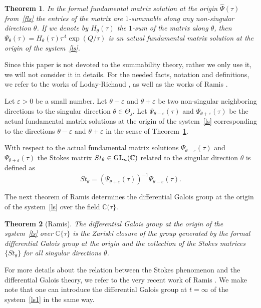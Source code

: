 \documentclass[10pt,a4paper]{amsart}
\numberwithin{equation}{section}
\newtheorem{Theorem}{Theorem}[section]
\begin{document}
 \begin{Theorem}\label{R}
 In the formal fundamental matrix solution at the origin $\hat{\Psi}(\tau)$ from~\eqref{fls} the entries of the
 matrix  are $1$-summable along any non-singular direction $\theta$. If we denote by $H_{\theta}(\tau)$
 the $1$-sum of the matrix  along $\theta$, then
 $\Psi_{\theta}(\tau)=H_{\theta}(\tau) \tau^{\Lambda} \exp(Q/\tau)$ is an actual fundamental matrix solution at the origin
 of the system~\eqref{ls}.
 \end{Theorem}
 Since this paper is not devoted to the summability theory, rather we only use it, we will not consider it in details.
 For the needed facts, notation and definitions, we refer to the works of Loday-Richaud \cite{LR}, as well as
 the works of Ramis \cite{R3, R2}.

 Let $\varepsilon > 0$ be a small number. Let $\theta-\varepsilon$ and $\theta+\varepsilon$ be two non-singular neighboring
 directions to the singular direction $\theta\in \Theta_j$. Let $\Psi_{\theta-\varepsilon}(\tau)$ and $\Psi_{\theta+\varepsilon}(\tau)$
 be the actual fundamental matrix solutions at the origin of the system~\eqref{ls} corresponding to
 the directions $\theta-\varepsilon$ and $\theta+\varepsilon$ in the sense of Theorem~\ref{R}.
 \begin{Definition}\label{Sto}
With respect to the actual fundamental matrix solutions $\Psi_{\theta-\varepsilon}(\tau)$ and $\Psi_{\theta+\varepsilon}(\tau)$
 	the Stokes matrix $St_{\theta}\in{\rm GL}_n(\mathbb{C})$ related to the singular direction $\theta$ is defined as
 	 \[
 	 St_{\theta}=\left(\Psi_{\theta+\varepsilon}(\tau)\right)^{-1} \Psi_{\theta-\varepsilon}(\tau) .
 	 \]
 \end{Definition}

 The next theorem of Ramis \cite{R3} determines the differential Galois group at the origin of the system~\eqref{ls} over
 the field $\mathbb{C}(\tau\}$.
 \begin{Theorem}[Ramis]\label{Ra}
 The differential Galois group at the origin of the system~\eqref{ls} over $\mathbb{C}\{\tau\}$ is the Zariski closure
 of the group generated by the formal differential Galois group at the origin and the collection of the Stokes
 matrices $\{St_{\theta}\}$ for all singular directions $\theta$.
 \end{Theorem}
 For more details about the relation between the Stokes phenomenon and the differential Galois theory, we refer to the very recent
 work of Ramis \cite{R1}.
 We make note that one can introduce the differential Galois group at $t=\infty$ of the system~\eqref{ls1} in the same way.
\end{document}
